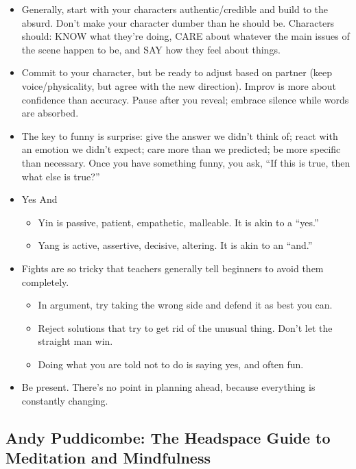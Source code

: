 \documentclass[
]{article}
\begin{document}
\begin{itemize}
\item
  Generally, start with your characters authentic/credible and build to
  the absurd. Don't make your character dumber than he should be.
  Characters should: KNOW what they're doing, CARE about whatever the
  main issues of the scene happen to be, and SAY how they feel about
  things.
\item
  Commit to your character, but be ready to adjust based on partner
  (keep voice/physicality, but agree with the new direction). Improv is
  more about confidence than accuracy. Pause after you reveal; embrace
  silence while words are absorbed.
\item
  The key to funny is surprise: give the answer we didn't think of;
  react with an emotion we didn't expect; care more than we predicted;
  be more specific than necessary. Once you have something funny, you
  ask, ``If this is true, then what else is true?''
\item
  Yes And

  \begin{itemize}
  \item
    Yin is passive, patient, empathetic, malleable. It is akin to a
    ``yes.''
  \item
    Yang is active, assertive, decisive, altering. It is akin to an
    ``and.''
  \end{itemize}
\item
  Fights are so tricky that teachers generally tell beginners to avoid
  them completely.

  \begin{itemize}
  \item
    In argument, try taking the wrong side and defend it as best you
    can.
  \item
    Reject solutions that try to get rid of the unusual thing. Don't let
    the straight man win.
  \item
    Doing what you are told not to do is saying yes, and often fun.
  \end{itemize}
\item
  Be present. There's no point in planning ahead, because everything is
  constantly changing.
\end{itemize}

\hypertarget{andy-puddicombe-the-headspace-guide-to-meditation-and-mindfulness}{%
\subsection{Andy Puddicombe: The Headspace Guide to Meditation and
Mindfulness}\label{andy-puddicombe-the-headspace-guide-to-meditation-and-mindfulness}}
\end{document}
